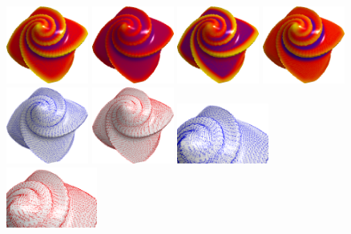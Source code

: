 \documentclass{llncs}
\begin{document}
\begin{figure}
  \begin{center}
    {\includegraphics[width=2.7cm]{figs/Octa_mean}}
    {\includegraphics[width=2.7cm]{figs/Octa_gaussian}}
    {\includegraphics[width=2.7cm]{figs/Octa_k1}}
    {\includegraphics[width=2.7cm]{figs/Octa_k2}}\\
    {\includegraphics[width=2.7cm]{figs/Octa_dir_min}}
    {\includegraphics[width=2.7cm]{figs/Octa_dir_max}}
    {\includegraphics[height=2.0cm]{figs/Octa_dir_min_zoom}}
    {\includegraphics[height=2.0cm]{figs/Octa_dir_max_zoom}}\\

\end{center}
\end{figure}
\end{document}
